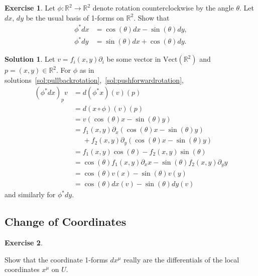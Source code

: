 \documentclass[11pt, a4paper]{article}
\theoremstyle{definition}
\newtheorem{ex}{Exercise}[part]
\newtheorem{sol}{Solution}[part]
\begin{document}
\begin{ex}

Let $\phi: \mathbb{R}^2 \to \mathbb{R}^2$ denote rotation counterclockwise by the angle $\theta$. Let $dx$, $dy$ be the usual basis of 1-forms on $\mathbb{R}^2$. Show that
\begin{align*}
    \phi^* dx &= \cos(\theta) dx - \sin(\theta) dy, \\
    \phi^* dy &= \sin(\theta) dx + \cos(\theta) dy.
\end{align*}

\end{ex}

\begin{sol}

Let $v = f_i(x, y)\partial_i$ be some vector in $\text{Vect}(\mathbb{R}^2)$ and $p = (x, y) \in \mathbb{R}^2$. For $\phi$ as in solutions~\ref{sol:pullbackrotation},~\ref{sol:pushforwardrotation},
\begin{align*}
    {(\phi^* dx)}_p v &= d(\phi^* x)(v)(p) \\
        &= d(x \circ \phi)(v)(p) \\
        &= v(\cos(\theta) x - \sin(\theta) y) \\
        &= f_1(x, y) \partial_x (\cos(\theta) x - \sin(\theta) y) \\
        &\mathrel{\phantom{=}}{} + f_2(x, y) \partial_y (\cos(\theta) x
                                 - \sin(\theta) y) \\
        &= f_1(x, y) \cos(\theta) - f_2(x, y) \sin(\theta) \\
        &= \cos(\theta) f_1(x, y) \partial_x x
           - \sin(\theta) f_2(x, y) \partial_y y \\
        &= \cos(\theta) v(x) - \sin(\theta) v(y) \\
        &= \cos(\theta) dx(v) - \sin(\theta) dy(v)
\end{align*}
and similarly for $\phi^* dy$.

\end{sol}

\subsection{Change of Coordinates}

\begin{ex}\label{ex:coordinatetransformation1form}

Show that the coordinate 1-forms $dx^\mu$ really are the differentials of the local coordinates $x^\mu$ on $U$.

\end{ex}
\end{document}
